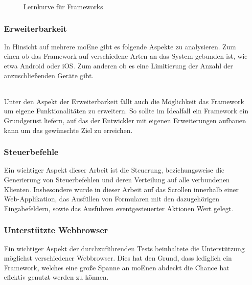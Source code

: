 \begin{figure}[H]
	\centering
	\vspace{-25pt}
	\caption[Darstellung der Lernkurve für \Gls{Framework}s]{Lernkurve für \Gls{Framework}s}
\end{figure}
\vspace{-40pt}


	\pagebreak
	 \subsubsection{Erweiterbarkeit}
	 In Hinsicht auf mehrere \Gls{moEn}e gibt es folgende Aspekte zu analysieren. Zum einen ob das \Gls{Framework} auf verschiedene 	Arten an das System gebunden ist, wie etwa Android oder iOS. Zum anderen ob es eine Limitierung der Anzahl der 				anzuschließenden Geräte gibt. 

	\\Unter den Aspekt der Erweiterbarkeit fällt auch die Möglichkeit das \Gls{Framework} um eigene Funktionalitäten zu erweitern. So 		sollte im Idealfall ein \Gls{Framework} ein Grundgerüst liefern, auf das der Entwickler mit eigenen Erweiterungen aufbauen kann um 	das gewünschte Ziel zu erreichen.
	
	\subsubsection{Steuerbefehle}
	Ein wichtiger Aspekt dieser Arbeit ist die Steuerung, beziehungsweise die Generierung von Steuerbefehlen und deren Verteilung auf alle verbundenen Klienten. Insbesondere wurde in dieser Arbeit auf das Scrollen innerhalb einer \mbox{Web-Applikation}, das Ausfüllen von Formularen mit den dazugehörigen Eingabefeldern, sowie das Ausführen eventgesteuerter Aktionen Wert gelegt.

	\subsubsection{Unterstützte \Gls{Webbrowser}}
	Ein wichtiger Aspekt der durchzuführenden Tests beinhaltete die Unterstützung möglichst verschiedener \Gls{Webbrowser}. Dies hat den Grund, dass lediglich ein \Gls{Framework}, welches eine große Spanne an \Gls{moEn}en abdeckt die Chance hat effektiv genutzt werden zu können.

